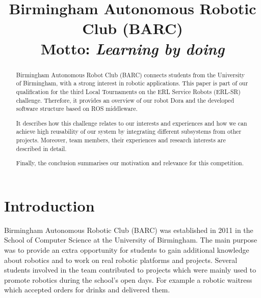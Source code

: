 \documentclass[conference]{IEEEtran}
\begin{document}
\title{Birmingham Autonomous Robotic Club (BARC)\\
\LARGE Motto: \textit{Learning by doing}}


\author{
}


\maketitle

\begin{abstract}

Birmingham Autonomous Robot Club (BARC) connects students from the University of Birmingham, with a strong interest in robotic applications. 
This paper is part of our qualification for the third Local Tournaments on the ERL Service Robots (ERL-SR) challenge. 
Therefore, it provides an overview of our robot Dora and the developed software structure based on ROS middleware. 

It describes how this challenge relates to our interests and experiences and how we can achieve high reusability of our system by integrating different subsystems from other projects. Moreover, team members, their experiences and research interests are described in detail. 

Finally, the conclusion summarises our motivation and relevance for this competition.


\end{abstract}

\IEEEpeerreviewmaketitle



\section{Introduction}

Birmingham Autonomous Robotic Club (BARC) was established in 2011 in the School of Computer Science at the University of Birmingham. The main purpose was to provide an extra opportunity for students to gain additional knowledge about robotics and to work on real robotic platforms and projects. Several students involved in the team contributed to projects which were mainly used to promote robotics during the school's open days. For example a robotic waitress which accepted orders for drinks and delivered them.
\end{document}
